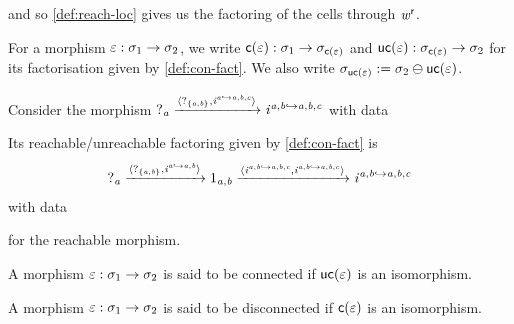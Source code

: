 \begin{definition}
    and so \cref{def:reach-loc} gives us the factoring of the cells through $\mathit{w}^{\mathsf{r}}$.
\end{definition}

\begin{notation}
    For a morphism $\varepsilon : \sigma_1 \to \sigma_2$, we write $\mathsf{c}(\varepsilon) : \sigma_1 \to \sigma_{\mathsf{c}(\varepsilon)}$ and $\mathsf{uc}(\varepsilon) : \sigma_{\mathsf{c}(\varepsilon)} \to \sigma_2$ for its factorisation given by \cref{def:con-fact}.
    We also write $\sigma_{\mathsf{uc}(\varepsilon)} := \sigma_2 \ominus \mathsf{uc}(\varepsilon)$.
\end{notation}

\begin{example}
    \renewcommand\ndsize{15}

    Consider the morphism $?_{\mathit{a}} \xrightarrow{\langle?_{\{\mathit{a},\mathit{b}\}}, \mathit{i}^{\mathit{a} \hookrightarrow \mathit{a},\mathit{b},\mathit{c}}\rangle} \mathit{i}^{\mathit{a},\mathit{b} \hookrightarrow \mathit{a},\mathit{b},\mathit{c}}$ with data

    Its reachable/unreachable factoring given by \cref{def:con-fact} is
    \[ ?_{\mathit{a}} \xrightarrow{\langle?_{\{\mathit{a},\mathit{b}\}}, \mathit{i}^{\mathit{a} \hookrightarrow \mathit{a},\mathit{b}}\rangle} 1_{\mathit{a},\mathit{b}} \xrightarrow{\langle\mathit{i}^{\mathit{a},\mathit{b} \hookrightarrow \mathit{a},\mathit{b},\mathit{c}}, \mathit{i}^{\mathit{a},\mathit{b} \hookrightarrow \mathit{a},\mathit{b},\mathit{c}}\rangle} \mathit{i}^{\mathit{a},\mathit{b} \hookrightarrow \mathit{a},\mathit{b},\mathit{c}} \]
    with data
     for the reachable morphism.
\end{example}

\begin{definition}\label{def:connected-morph}
    A morphism $\varepsilon : \sigma_1 \to \sigma_2$ is said to be connected if $\mathsf{uc}(\varepsilon)$ is an isomorphism.
\end{definition}
\begin{definition}
    A morphism $\varepsilon : \sigma_1 \to \sigma_2$ is said to be disconnected if $\mathsf{c}(\varepsilon)$ is an isomorphism.
\end{definition}

